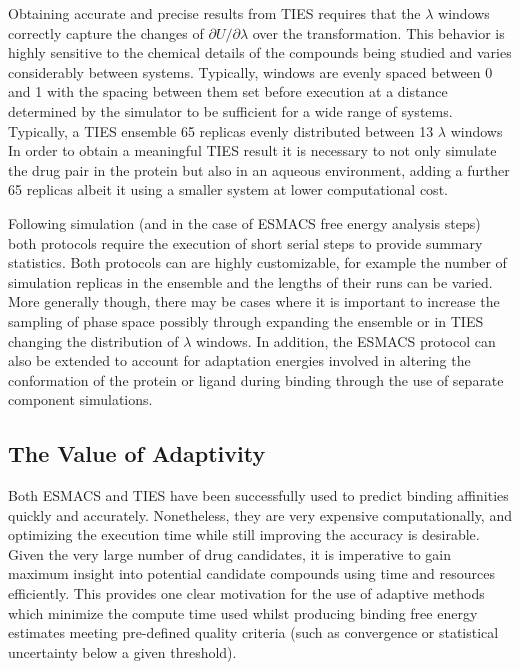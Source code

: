 Obtaining accurate and precise results from TIES requires that the $\lambda$ 
windows correctly capture the changes of $\partial U/\partial\lambda$ over 
the transformation. This behavior is highly sensitive to
the chemical details of the compounds being studied and varies considerably 
between systems. Typically, windows are evenly spaced between 0 and 1 with 
the spacing between them set before execution at a distance determined by the 
simulator to be sufficient for a wide range of systems. Typically, a TIES 
ensemble 65 replicas evenly distributed between 13 $\lambda$ windows
In order to obtain a meaningful TIES result it is necessary to not only 
simulate the drug pair in the protein but also in an aqueous environment, 
adding a further 65 replicas albeit it using a smaller system at lower 
computational cost.


Following simulation (and in the case of ESMACS free energy analysis steps) 
both protocols require the execution of short serial steps to provide summary 
statistics. Both protocols can are highly customizable, for example the number 
of simulation replicas in the ensemble and the lengths of their runs can be 
varied. More generally though, there may be cases where it is important to 
increase the sampling of phase space possibly through expanding the ensemble 
or in TIES changing the distribution of $\lambda$ windows.
In addition, the ESMACS protocol can also be extended to account for 
adaptation energies involved in altering the conformation of the protein 
or ligand during binding through the use of separate component simulations.


\subsection{The Value of Adaptivity}

Both ESMACS and TIES have been successfully used to predict binding affinities
quickly and accurately. Nonetheless, they are very expensive computationally,
and optimizing the execution time while still improving the accuracy is
desirable. Given the very large number of drug candidates, it is imperative to
gain maximum insight into potential candidate compounds using time and
resources efficiently. This provides one clear motivation for the use of
adaptive methods which minimize the compute time used whilst producing binding
free energy estimates meeting pre-defined quality criteria (such as
convergence or statistical uncertainty below a given threshold).
  
